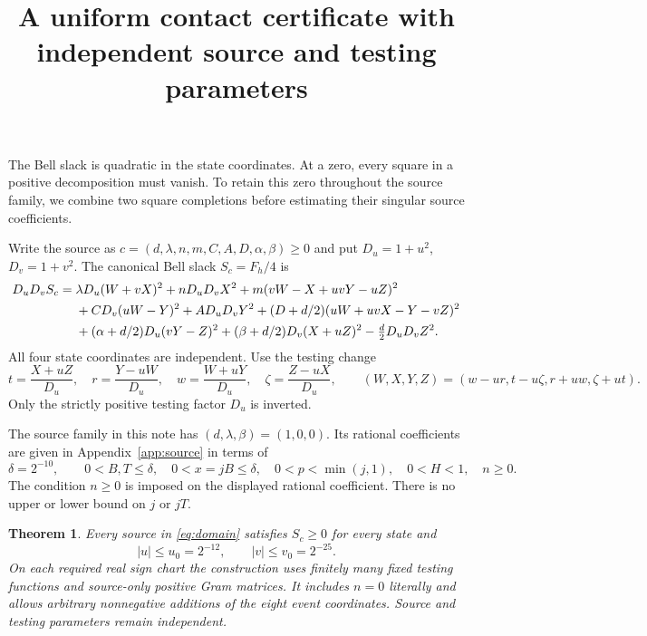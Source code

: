 \documentclass[10pt]{article}
\title{A uniform contact certificate with independent source and testing parameters}
\author{}\date{}
\newtheorem{theorem}{Theorem}
\begin{document}
\maketitle\vspace{-2em}

The Bell slack is quadratic in the state coordinates. At a zero, every
square in a positive decomposition must vanish. To retain this zero
throughout the source family, we combine two square completions before
estimating their singular source coefficients.

Write the source as $c=(d,\lambda,n,m,C,A,D,\alpha,\beta)\geq0$ and
put $D_u=1+u^2$, $D_v=1+v^2$. The canonical Bell slack $S_c=F_h/4$ is
\begin{align}
 D_uD_vS_c={}&\lambda D_u(W+vX)^2+nD_uD_vX^2
 +m(vW-X+uvY-uZ)^2 \notag\\
 &+CD_v(uW-Y)^2+AD_uD_vY^2
 +(D+d/2)(uW+uvX-Y-vZ)^2 \notag\\
 &+(\alpha+d/2)D_u(vY-Z)^2
 +(\beta+d/2)D_v(X+uZ)^2-\tfrac d2D_uD_vZ^2 .
 \label{eq:slack}
\end{align}
All four state coordinates are independent. Use the testing change
\begin{equation}
 t=\frac{X+uZ}{D_u},\quad r=\frac{Y-uW}{D_u},\quad
 w=\frac{W+uY}{D_u},\quad \zeta=\frac{Z-uX}{D_u},
 \qquad
 (W,X,Y,Z)=(w-ur,t-u\zeta,r+uw,\zeta+ut).
 \label{eq:rotation}
\end{equation}
Only the strictly positive testing factor $D_u$ is inverted.

The source family in this note has $(d,\lambda,\beta)=(1,0,0)$.
Its rational coefficients are given in Appendix~\ref{app:source} in terms of
\begin{equation}
 \delta=2^{-10},\qquad
 0<B,T\leq\delta,\quad0<x=jB\leq\delta,\quad
 0<p<\min(j,1),\quad0<H<1,\quad n\geq0.
 \label{eq:domain}
\end{equation}
The condition $n\geq0$ is imposed on the displayed rational coefficient.
There is no upper or lower bound on $j$ or $jT$.

\begin{theorem}\label{thm:cap}
Every source in \eqref{eq:domain} satisfies $S_c\geq0$ for every state and
\[
 |u|\leq u_0=2^{-12},\qquad |v|\leq v_0=2^{-25}.
\]
On each required real sign chart the construction uses finitely many fixed
testing functions and source-only positive Gram matrices. It includes
$n=0$ literally and allows arbitrary nonnegative additions of the eight
event coordinates. Source and testing parameters remain independent.
\end{theorem}
\end{document}
